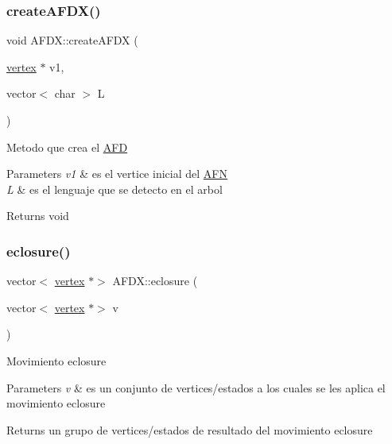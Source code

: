 \subsubsection{\texorpdfstring{create\+A\+F\+D\+X()}{createAFDX()}}
{\footnotesize\ttfamily void A\+F\+D\+X\+::create\+A\+F\+DX (\begin{DoxyParamCaption}\item[{\hyperlink{structvertex}{vertex} $\ast$}]{v1,  }\item[{vector$<$ char $>$}]{L }\end{DoxyParamCaption})}

Metodo que crea el \hyperlink{class_a_f_d}{A\+FD} 
\begin{DoxyParams}{Parameters}
{\em v1} & es el vertice inicial del \hyperlink{class_a_f_n}{A\+FN} \\
\hline
{\em L} & es el lenguaje que se detecto en el arbol \\
\hline
\end{DoxyParams}
\begin{DoxyReturn}{Returns}
void 
\end{DoxyReturn}
\hypertarget{class_a_f_d_x_af0430e9d0436d6a02e75549d36f46b14}{}\label{class_a_f_d_x_af0430e9d0436d6a02e75549d36f46b14} 
\subsubsection{\texorpdfstring{eclosure()}{eclosure()}}
{\footnotesize\ttfamily vector$<$ \hyperlink{structvertex}{vertex} $\ast$$>$ A\+F\+D\+X\+::eclosure (\begin{DoxyParamCaption}\item[{vector$<$ \hyperlink{structvertex}{vertex} $\ast$$>$}]{v }\end{DoxyParamCaption})}

Movimiento eclosure 
\begin{DoxyParams}{Parameters}
{\em v} & es un conjunto de vertices/estados a los cuales se les aplica el movimiento eclosure \\
\hline
\end{DoxyParams}
\begin{DoxyReturn}{Returns}
un grupo de vertices/estados de resultado del movimiento eclosure 
\end{DoxyReturn}
\hypertarget{class_a_f_d_x_a65d0f9d058236fd49de2ecec65dc35ef}{}\label{class_a_f_d_x_a65d0f9d058236fd49de2ecec65dc35ef} 
